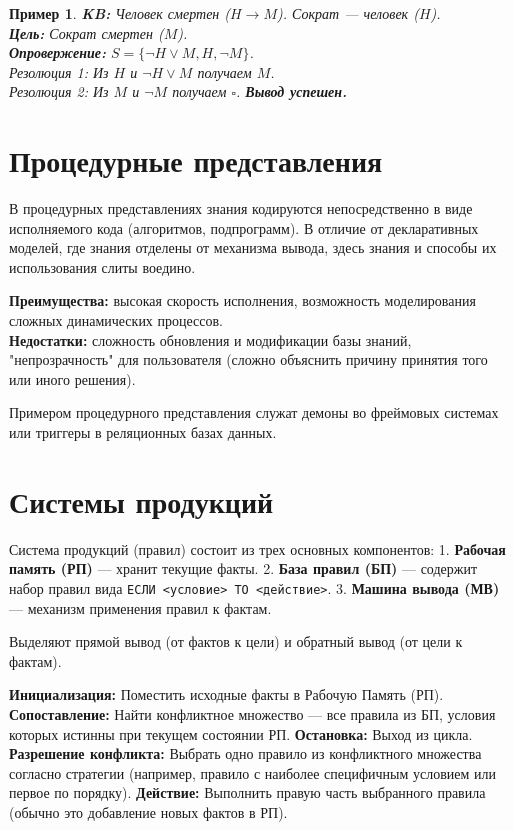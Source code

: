 \documentclass[12pt,a4paper]{article}
\newtheorem{example}{Пример}
\begin{document}
\begin{example}
\textbf{KB:} Человек смертен ($H \to M$). Сократ — человек ($H$).\\
\textbf{Цель:} Сократ смертен ($M$).\\
\textbf{Опровержение:} $S = \{\neg H \lor M, H, \neg M\}$. \\
Резолюция 1: Из $H$ и $\neg H \lor M$ получаем $M$.\\
Резолюция 2: Из $M$ и $\neg M$ получаем $\square$. \textbf{Вывод успешен.}
\end{example}

\section{Процедурные представления}

В процедурных представлениях знания кодируются непосредственно в виде исполняемого кода (алгоритмов, подпрограмм). В отличие от декларативных моделей, где знания отделены от механизма вывода, здесь знания и способы их использования слиты воедино.

\textbf{Преимущества:} высокая скорость исполнения, возможность моделирования сложных динамических процессов.\\
\textbf{Недостатки:} сложность обновления и модификации базы знаний, "непрозрачность" для пользователя (сложно объяснить причину принятия того или иного решения).

Примером процедурного представления служат демоны во фреймовых системах или триггеры в реляционных базах данных.

\section{Системы продукций}

Система продукций (правил) состоит из трех основных компонентов:
1. \textbf{Рабочая память (РП)} — хранит текущие факты.
2. \textbf{База правил (БП)} — содержит набор правил вида \texttt{ЕСЛИ <условие> ТО <действие>}.
3. \textbf{Машина вывода (МВ)} — механизм применения правил к фактам.

Выделяют прямой вывод (от фактов к цели) и обратный вывод (от цели к фактам).

\begin{algorithm}
\caption{Алгоритм прямого вывода}\label{alg:forward_chaining}
\begin{algorithmic}[1]
\State \textbf{Инициализация:} Поместить исходные факты в Рабочую Память (РП).
\Loop
    \State \textbf{Сопоставление:} Найти конфликтное множество — все правила из БП, условия которых истинны при текущем состоянии РП.
        \State \textbf{Остановка:} Выход из цикла.
    \EndIf
    \State \textbf{Разрешение конфликта:} Выбрать одно правило из конфликтного множества согласно стратегии (например, правило с наиболее специфичным условием или первое по порядку).
    \State \textbf{Действие:} Выполнить правую часть выбранного правила (обычно это добавление новых фактов в РП).
\EndLoop
\end{algorithmic}
\end{algorithm}
\end{document}
